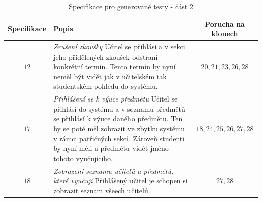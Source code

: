 \documentclass[czech, ma, kiv, he, iso690numb, pdf, viewonly]{fasthesis}
\begin{document}
    \begin{table}
        \begin{tabular}{|c|p{7cm}|c|}
            \hline
            \textbf{Specifikace} & \textbf{Popis} & \textbf{Porucha na klonech} \\
            \hline
            \(12\) & \textit{Zrušení zkoušky} \newline Učitel se přihlásí a v sekci jeho přidělených zkoušek odstraní konkrétní termín. Tento termín by nyní neměl být vidět jak v učitelském tak studentském pohledu do systému. & \(20, 21, 23, 26, 28\) \\
            \hline
            \(17\) & \textit{Přihlášení se k výuce předmětu} \newline Učitel se přihlásí do systému a v seznamu předmětů se přihlásí k výuce daného předmětu. Ten by se poté měl zobrazit ve zbytku systému v rámci patřičných sekcí. Zároveň studenti by nyní měli u předmětu vidět jméno tohoto vyučujícího. & \(18, 24, 25, 26, 27, 28\) \\
            \hline
            \(18\) & \textit{Zobrazení seznamu učitelů a předmětů, které vyučují} \newline Přihlášený učitel je schopen si zobrazit seznam všeech učitelů. & \(27, 28\) \\
            \hline
        \end{tabular}
        \centering
        \label{tab:specs_2}
        \caption{Specifikace pro generované testy - část 2}
    \end{table}
\end{document}
